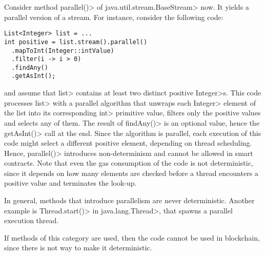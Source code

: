 Consider method \<parallel()> of \<java.util.stream.BaseStream> now.
It yields a parallel version of a stream. For instance, consider the following code:
%
\begin{verbatim}
List<Integer> list = ...
int positive = list.stream().parallel()
  .mapToInt(Integer::intValue)
  .filter(i -> i > 0)
  .findAny()
  .getAsInt();
\end{verbatim}
%
and assume that \<list> contains at least two distinct positive \<Integer>s.
This code processes \<list> with a parallel algorithm
that unwraps each \<Integer> element of the list into its corresponding \<int> primitive value,
filters only the positive values and selects any of them.
The result of \<findAny()> is an optional value, hence the
\<getAsInt()> call at the end. Since the algorithm is
parallel, each execution of this code might select a different
positive element, depending on thread scheduling. Hence, \<parallel()>
introduces non-determinism and
cannot be allowed in smart contracts. Note that even the gas consumption
of the code is not deterministic, since it depends on how many elements
are checked before a thread encounters a positive value and terminates
the look-up.

In general, methods that introduce parallelism are never deterministic.
Another example is \<Thread.start()> in \<java.lang.Thread>, that spawns
a parallel execution thread.

If methods of this category are used, then the code cannot be used in blockchain,
since there is not way to make it deterministic.
